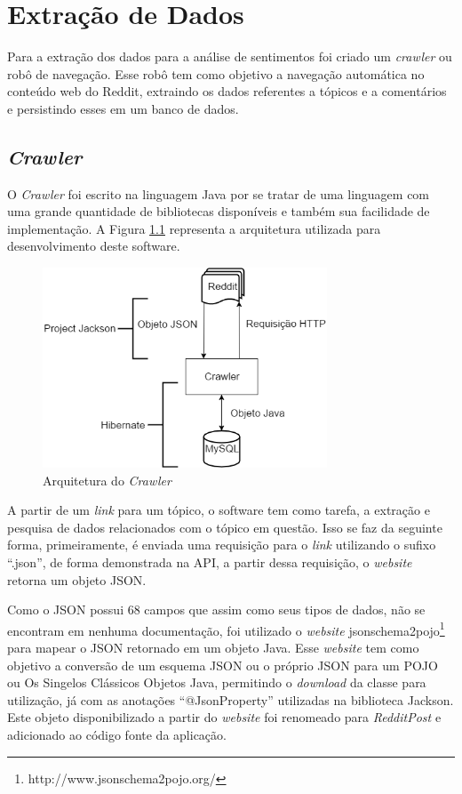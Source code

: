 \chapter{Extração de Dados}
\label{cap:Extracao}

Para a extração dos dados para a análise de sentimentos foi criado um
\textit{crawler} ou robô de navegação. Esse robô tem como objetivo a navegação
automática no conteúdo web do Reddit, extraindo os dados referentes a tópicos e
a comentários e persistindo esses em um banco de dados. 

\section{\textit{Crawler}}

O \textit{Crawler} foi escrito na linguagem Java por se tratar de uma linguagem
com uma grande quantidade de bibliotecas disponíveis e também
sua facilidade de implementação. A Figura \ref{fig:crawler} representa a
arquitetura utilizada para desenvolvimento deste software.

\begin{figure}[htbp]
 \centering
 \includegraphics[height=225px]{imagens/arquitetura.png}
 \caption{Arquitetura do \textit{Crawler}}
 \label{fig:crawler}
\end{figure}

A partir de um \textit{link} para um tópico, o software tem como tarefa, a
extração e pesquisa de dados relacionados com o tópico em questão. Isso se faz
da seguinte forma, primeiramente, é enviada uma requisição para o \textit{link}
utilizando o sufixo ``.json'', de forma demonstrada na API, a partir dessa
requisição, o \textit{website} retorna um objeto \ac{JSON}. 

Como o \ac{JSON} possui 68 campos que assim como seus tipos de dados, não se
encontram em nenhuma documentação, foi utilizado o \textit{website}
jsonschema2pojo\footnote{http://www.jsonschema2pojo.org/} para mapear o \ac{JSON} retornado em um
objeto Java. Esse \textit{website} tem como objetivo a conversão de um esquema \ac{JSON} ou o próprio \ac{JSON} para um \ac{POJO} ou Os Singelos Clássicos Objetos Java, permitindo
o \textit{download} da classe para utilização, já com as anotações
``@JsonProperty'' utilizadas na biblioteca Jackson. Este objeto disponibilizado a
partir do \textit{website} foi renomeado para \textit{RedditPost} e adicionado
ao código fonte da aplicação.

